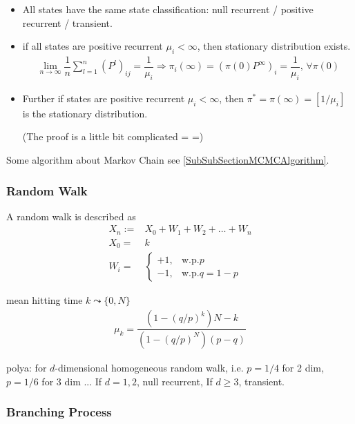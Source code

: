 \begin{itemize}[topsep=2pt,itemsep=0pt]
    \item All states have the same state classification: null recurrent / positive recurrent / transient.
    \item if all states are positive recurrent $ \mu _i<\infty $, then stationary distribution exists.
    \begin{align*}
        \lim_{n\to \infty}\dfrac{1}{n}\sum_{l=1}^n(P^l)_{ij}=\dfrac{1}{\mu _i}\Rightarrow \pi_i(\infty)=(\pi(0)P^\infty)_i= \dfrac{1}{\mu _i},\, \forall \pi(0)
    \end{align*}
    \item Further if states are positive recurrent $ \mu _i<\infty $, then $ \pi^*=\pi(\infty)=[1/\mu _i] $ is the stationary distribution.

    (The proof is a little bit complicated = =)
    
\end{itemize}

Some algorithm about Markov Chain see \autoref{SubSubSectionMCMCAlgorithm}.




\subsubsection{Random Walk}

A random walk is described as
\begin{align*}
    X_n:=&X_0+W_1+W_2+\ldots+W_n\\
    X_0=&k\\
    W_i=&\begin{cases}
        +1,&\mathrm{w.p.} p\\
        -1,&\mathrm{w.p.} q=1-p 
    \end{cases}
\end{align*}



mean hitting time $ k\leadsto \{0,N\} $
\begin{align*}
    \mu _k=\dfrac{\left(1-(q/p)^k\right)N-k}{\left(1-(q/p)^N\right)(p-q)} 
\end{align*}


polya: for $ d $-dimensional homogeneous random walk, i.e. $ p=1/4 $ for 2 dim, $ p=1/6 $ for 3 dim ... If $ d=1,2 $, null recurrent, If $ d\geq 3 $, transient.


\subsubsection{Branching Process}


